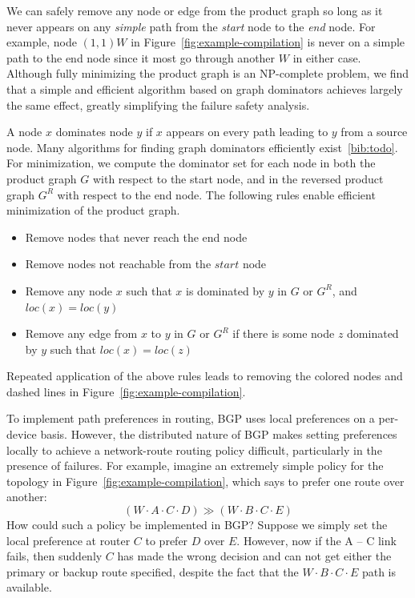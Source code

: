 We can safely remove any node or edge from the product graph so long as it never appears on any \emph{simple} path from the \textit{start} node to the \emph{end} node. For example, node $(1,1) W$ in Figure~\ref{fig:example-compilation} is never on a simple path to the end node since it most go through another $W$ in either case.
%
Although fully minimizing the product graph is an NP-complete problem, we find that a simple and efficient algorithm based on graph dominators achieves largely the same effect, greatly simplifying the failure safety analysis.

A node $x$ dominates node $y$ if $x$ appears on every path leading to $y$ from a source node. Many algorithms for finding graph dominators efficiently exist~\ref{bib:todo}. For minimization, we compute the dominator set for each node in both the product graph $G$ with respect to the start node, and in the reversed product graph $G^R$ with respect to the end node. The following rules enable efficient minimization of the product graph.
%
\begin{itemize}
  \item Remove nodes that never reach the end node
  \item Remove nodes not reachable from the $start$ node
  \item Remove any node $x$ such that $x$ is dominated by $y$ in $G$ or $G^R$, and $loc(x) = loc(y)$
  \item Remove any edge from $x$ to $y$ in $G$ or $G^R$ if there is some node $z$ dominated by $y$ such that $loc(x) = loc(z)$
\end{itemize}
%
Repeated application of the above rules leads to removing the colored nodes and dashed lines in Figure~\ref{fig:example-compilation}.


To implement path preferences in routing, BGP uses local preferences on a per-device basis. However, the distributed nature of BGP makes setting preferences locally to achieve a network-route routing policy difficult, particularly in the presence of failures. For example, imagine an extremely simple policy for the topology in Figure~\ref{fig:example-compilation}, which says to prefer one route over another:
%
$$(W \cdot A \cdot C \cdot D) \gg (W \cdot B \cdot C \cdot E)$$
%
How could such a policy be implemented in BGP? Suppose we simply set the local preference at router $C$ to prefer $D$ over $E$. However, now if the A -- C link fails, then suddenly $C$ has made the wrong decision and can not get either the primary or backup route specified, despite the fact that the $W \cdot B \cdot C \cdot E$ path is available.

